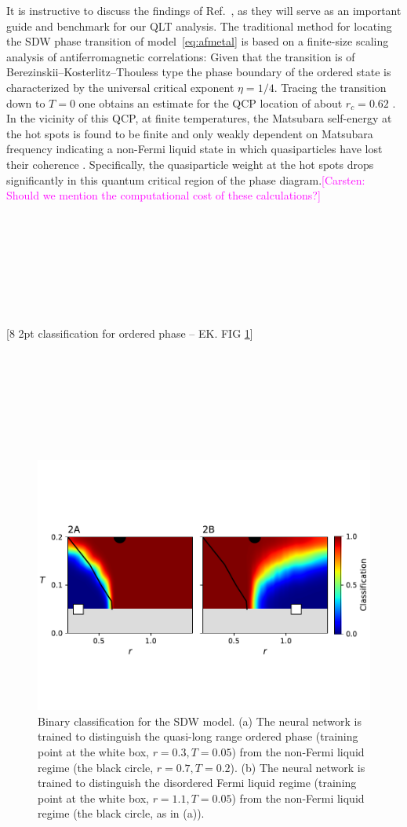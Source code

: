 \documentclass[amsmath,amssymb, aps, prx, longbibliography, twocolumn]{revtex4-1}
\newcommand{\cb}[1]{\textcolor{magenta}{[Carsten: #1]}}
\begin{document}
It is instructive to discuss the findings of Ref.~\cite{Gerlach2017}, as they will serve as an important guide and benchmark for our QLT analysis. The traditional method for locating the SDW phase transition of model~\eqref{eq:afmetal} is based on a finite-size scaling analysis of antiferromagnetic correlations: Given that the transition is of Berezinskii–Kosterlitz–Thouless type the phase boundary of the ordered state is characterized by the universal critical exponent $\eta = 1/4$. Tracing the transition down to $T=0$ one obtains an estimate for the QCP location of about $r_c = 0.62$ \cite{Gerlach2017}. In the vicinity of this QCP, at finite temperatures, the Matsubara self-energy at the hot spots is found to be finite and only weakly dependent on Matsubara frequency indicating a non-Fermi liquid state in which quasiparticles have lost their coherence \cite{Gerlach2017}. Specifically, the quasiparticle weight at the hot spots drops significantly in this quantum critical region of the phase diagram.\cb{Should we mention the computational cost of these calculations?}
\\
\\
\\
\\
\\
\\
\\
\\
\\

[8 2pt classification for ordered phase -- EK. FIG \ref{fig:2ptsdw}]
\\
\\
\\
\\
\\
\\
\\
\\
 \begin{figure} [t]
    \centering
\includegraphics[width=.45\textwidth, trim={0 2.5cm 0 3cm}, clip]{2pt_sdw.pdf}
    \caption{Binary classification for the SDW model. (a) The neural network is trained to distinguish the quasi-long range ordered phase (training point at the white box, $r=0.3,T=0.05$) from the non-Fermi liquid regime (the black circle, $r=0.7,T=0.2$). (b) The neural network is trained to distinguish the disordered Fermi liquid regime (training point at the white box, $r=1.1,T=0.05$) from the non-Fermi liquid regime (the black circle, as in (a)).}
    \label{fig:2ptsdw}
\end{figure}
\end{document}
